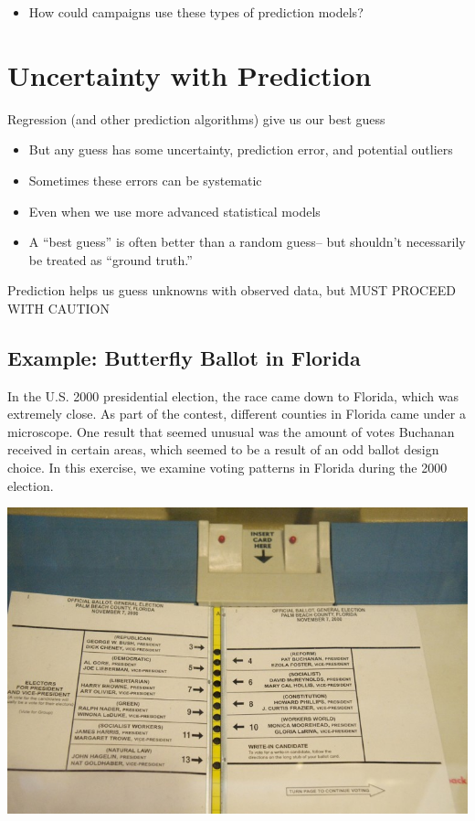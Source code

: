 \documentclass[
  letterpaper,
  DIV=11,
  numbers=noendperiod]{scrreprt}
\providecommand{\tightlist}{%
  \setlength{\itemsep}{0pt}\setlength{\parskip}{0pt}}\usepackage{longtable,booktabs,array}
\begin{document}
\begin{itemize}
\tightlist
\item
  How could campaigns use these types of prediction models?
\end{itemize}

\hypertarget{uncertainty-with-prediction}{%
\section{Uncertainty with
Prediction}\label{uncertainty-with-prediction}}

Regression (and other prediction algorithms) give us our best guess

\begin{itemize}
\tightlist
\item
  But any guess has some uncertainty, prediction error, and potential
  outliers
\item
  Sometimes these errors can be systematic
\item
  Even when we use more advanced statistical models
\item
  A ``best guess'' is often better than a random guess-- but shouldn't
  necessarily be treated as ``ground truth.''
\end{itemize}

Prediction helps us guess unknowns with observed data, but MUST PROCEED
WITH CAUTION

\hypertarget{example-butterfly-ballot-in-florida}{%
\subsection{Example: Butterfly Ballot in
Florida}\label{example-butterfly-ballot-in-florida}}

In the U.S. 2000 presidential election, the race came down to Florida,
which was extremely close. As part of the contest, different counties in
Florida came under a microscope. One result that seemed unusual was the
amount of votes Buchanan received in certain areas, which seemed to be a
result of an odd ballot design choice. In this exercise, we examine
voting patterns in Florida during the 2000 election.

\includegraphics{images/chad.jpg}
\end{document}
